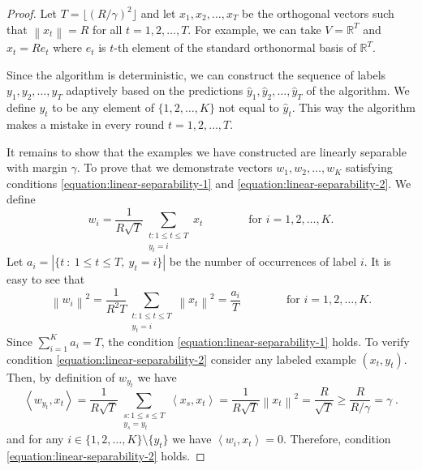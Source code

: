 \documentclass[12pt]{article}
\newcommand{\R}{\mathbb{R}}  %
\newcommand{\ip}[2]{\left\langle #1, #2 \right\rangle} %
\newcommand{\norm}[1]{\left\| #1 \right\|}  %
\begin{document}
\begin{proof}
Let $T = \lfloor (R/\gamma)^2 \rfloor$ and let $x_1, x_2, \dots, x_T$ be the
orthogonal vectors such that $\norm{x_t} = R$ for all $t=1,2,\dots,T$. For
example, we can take $V = \R^T$ and $x_t = R e_t$ where $e_t$ is $t$-th element
of the standard orthonormal basis of $\R^T$.

Since the algorithm is deterministic, we can construct the sequence of labels
$y_1, y_2, \dots, y_T$ adaptively based on the predictions $\widehat y_1,
\widehat y_2, \dots, \widehat y_T$ of the algorithm. We define $y_t$ to be any
element of $\{1,2,\dots,K\}$ not equal to $\widehat y_t$. This way the algorithm
makes a mistake in every round $t=1,2,\dots,T$.

It remains to show that the examples we have constructed are linearly separable
with margin $\gamma$. To prove that we demonstrate vectors $w_1, w_2, \dots, w_K$
satisfying conditions \eqref{equation:linear-separability-1} and
\eqref{equation:linear-separability-2}. We define
$$
w_i = \frac{1}{R\sqrt{T}} \sum_{\substack{t : 1 \le t \le T \\ y_t = i}} x_t \qquad \qquad \text{for $i=1,2,\dots,K$.}
$$
Let $a_i = |\{ t ~:~ 1 \le t \le T, \ y_t = i \}|$ be the number of occurrences of label $i$.
It is easy to see that
$$
\norm{w_i}^2 = \frac{1}{R^2 T} \sum_{\substack{t : 1 \le t \le T \\ y_t = i}} \norm{x_t}^2 = \frac{a_i}{T} \qquad \qquad \text{for $i=1,2,\dots,K$.}
$$
Since $\sum_{i=1}^K a_i = T$, the condition
\eqref{equation:linear-separability-1} holds. To verify condition
\eqref{equation:linear-separability-2} consider any labeled example $(x_t,
y_t)$. Then, by definition of $w_{y_t}$ we have
$$
\ip{w_{y_t}}{x_t}
= \frac{1}{R\sqrt{T}} \sum_{\substack{s : 1 \le s \le T \\ y_s = y_t}} \ip{x_s}{x_t}
= \frac{1}{R\sqrt{T}} \norm{x_t}^2
= \frac{R}{\sqrt{T}}
\ge \frac{R}{R/\gamma}
= \gamma \; .
$$
and for any $i \in \{1,2,\dots,K\} \setminus \{y_t\}$ we have
$\ip{w_i}{x_t} = 0$. Therefore, condition \eqref{equation:linear-separability-2} holds.
\end{proof}
\end{document}

